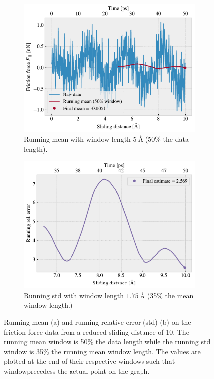 \begin{figure}[H]
  \centering
  \begin{subfigure}[t]{0.49\textwidth}
    \centering
    \includegraphics[width=\textwidth]{figures/baseline/Ff_runmean.pdf}
    \caption{Running mean with window length $\SI{5}{\text{Å}}$ (50\% the data length).}
    \label{fig:runmean}
  \end{subfigure}
  \hfill
  \begin{subfigure}[t]{0.49\textwidth}
      \centering
      \includegraphics[width=\textwidth]{figures/baseline/Ff_runstd.pdf}
      \caption{Running std with window length $\SI{1.75}{\text{Å}}$ (35\% the mean window length.)}
      \label{fig:runstd}
  \end{subfigure}
  \caption{Running mean (a) and running relative error (std) (b) on the friction force data from a reduced sliding distance of \SI{10}{{}}. The running mean window is 50\% the data length while the running std window is 35\% the running mean window length. The values are plotted at the end of their respective windows such that windowprecedess the actual point on the graph.}
  \label{fig:running}
\end{figure}

